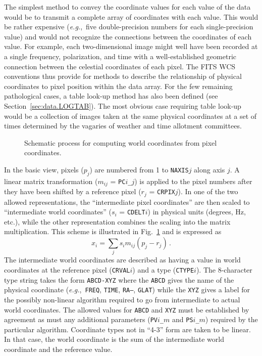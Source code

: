 \documentclass[twoside]{article}
\newcommand{\eg}{{\it e.g.},}
\newcommand{\keyw}[1]{\hbox{{\tt #1}}}
\newcommand{\putfig}[1]{\texttt{[image: data.fig\#1.eps]}}
\begin{document}
The simplest method to convey the coordinate values for each value of
the data would be to transmit a complete array of coordinates with
each value.  This would be rather expensive (\eg~five double-precision
numbers for each single-precision value) and would not recognize the
connections between the coordinates of each value.  For example, each
two-dimensional image might well have been recorded at a single
frequency, polarization, and time with a well-established geometric
connection between the celestial coordinates of each pixel.  The FITS
WCS conventions thus provide for methods to describe the relationship
of physical coordinates to pixel position within the data array.  For
the few remaining pathological cases, a table look-up method has also
been defined (see Section~\ref{sec:data.LOGTAB}).  The most obvious
case requiring table look-up would be a collection of images taken at
the same physical coordinates at a set of times determined by the
vagaries of weather and time allotment committees.

\begin{figure}
\begin{center}
\resizebox{!}{3.5in}{\putfig{01}}
\caption{Schematic process for computing world coordinates from pixel
  coordinates.}
\label{fig:data.basicwcs}
\end{center}
\end{figure}

In the basic view, pixels ($p_j$) are numbered from 1 to
\keyw{NAXIS$j$} along axis $j$.  A linear matrix transformation
($m_{ij}$ = \keyw{PC$i$\_$j$}) is applied to the pixel numbers after
they have been shifted by a reference pixel ($r_j$ = \keyw{CRPIX$j$}).
In one of the two allowed representations, the ``intermediate pixel
coordinates'' are then scaled to ``intermediate world coordinates''
($s_i$ = \keyw{CDELT$i$}) in physical units (degrees, Hz, etc.), while
the other representation combines the scaling into the matrix
multiplication.  This scheme is illustrated in
Fig.~\ref{fig:data.basicwcs} and is expressed as
\begin{equation}
   x_i = \sum_j s_i m_{ij} (p_j - r_j) \, .
\label{eq:data.IWCoord}
\end{equation}
The intermediate world coordinates are described as having a value in
world coordinates at the reference pixel (\keyw{CRVAL$i$}) and a type
(\keyw{CTYPE$i$})\@.  The 8-character type string takes the form
\keyw{ABCD-XYZ} where the \keyw{ABCD} gives the name of the physical
coordinate (\eg~\keyw{FREQ}, \keyw{TIME}, \keyw{RA--}, \keyw{GLAT})
while the \keyw{XYZ} gives a label for the possibly non-linear
algorithm required to go from intermediate to actual world
coordinates.  The allowed values for \keyw{ABCD} and \keyw{XYZ} must
be established by agreement as must any additional parameters
(\keyw{PV$i$\_$m$} and \keyw{PS$i$\_$m$}) required by the particular
algorithm.  Coordinate types not in ``4-3'' form are taken to be
linear.  In that case, the world coordinate is the sum of the
intermediate world coordinate and the reference value.
\end{document}
